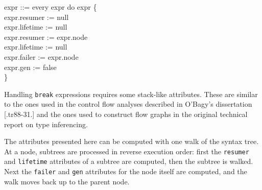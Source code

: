 \goodbreak
\begin{iconcode}
\>expr ::= every expr do expr \{\\
\>\>\>\>\>expr.resumer := null\\
\>\>\>\>\>expr.lifetime := null\\
\>\>\>\>\>expr.resumer := expr.node\\
\>\>\>\>\>expr.lifetime := null\\
\>\>\>\>\>expr.failer := expr.node\\
\>\>\>\>\>expr.gen := false\\
\>\>\>\>\>\}\\
\end{iconcode}


Handling \texttt{break} expressions requires some stack-like
attributes. These are similar to the ones used in the control flow
analyses described in O'Bagy's dissertation [.tr88-31.] and the ones
used to construct flow graphs in the original technical report on type
inferencing.

The attributes presented here can be computed with one walk of the
syntax tree. At a node, subtrees are processed in reverse execution
order: first the \texttt{resumer} and \texttt{lifetime} attributes of
a subtree are computed, then the subtree is walked. Next the
\texttt{failer} and \texttt{gen} attributes for the node itself are
computed, and the walk moves back up to the parent node.
